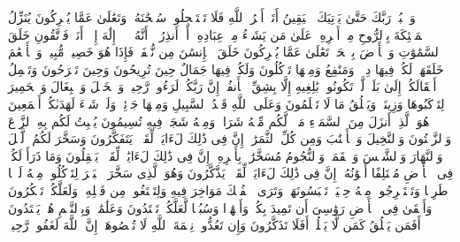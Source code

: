 \startbuffer[\q:15:99]
وَٱعۡبُدۡ رَبَّكَ حَتَّىٰ یَأۡتِیَكَ ٱلۡیَقِینُ%
\stopbuffer
\startbuffer[\q:16:1]
أَتَىٰۤ أَمۡرُ ٱللَّهِ فَلَا تَسۡتَعۡجِلُوهُۚ سُبۡحَٰنَهُۥ وَتَعَٰلَىٰ عَمَّا یُشۡرِكُونَ%
\stopbuffer
\startbuffer[\q:16:2]
یُنَزِّلُ ٱلۡمَلَٰۤئِكَةَ بِٱلرُّوحِ مِنۡ أَمۡرِهِۦ عَلَىٰ مَن یَشَاۤءُ مِنۡ عِبَادِهِۦۤ أَنۡ أَنذِرُوۤا۟ أَنَّهُۥ لَاۤ إِلَٰهَ إِلَّاۤ أَنَا۠ فَٱتَّقُونِ%
\stopbuffer
\startbuffer[\q:16:3]
خَلَقَ ٱلسَّمَٰوَٰتِ وَٱلۡأَرۡضَ بِٱلۡحَقِّۚ تَعَٰلَىٰ عَمَّا یُشۡرِكُونَ%
\stopbuffer
\startbuffer[\q:16:4]
خَلَقَ ٱلۡإِنسَٰنَ مِن نُّطۡفَةࣲ فَإِذَا هُوَ خَصِیمࣱ مُّبِینࣱ%
\stopbuffer
\startbuffer[\q:16:5]
وَٱلۡأَنۡعَٰمَ خَلَقَهَاۖ لَكُمۡ فِیهَا دِفۡءࣱ وَمَنَٰفِعُ وَمِنۡهَا تَأۡكُلُونَ%
\stopbuffer
\startbuffer[\q:16:6]
وَلَكُمۡ فِیهَا جَمَالٌ حِینَ تُرِیحُونَ وَحِینَ تَسۡرَحُونَ%
\stopbuffer
\startbuffer[\q:16:7]
وَتَحۡمِلُ أَثۡقَالَكُمۡ إِلَىٰ بَلَدࣲ لَّمۡ تَكُونُوا۟ بَٰلِغِیهِ إِلَّا بِشِقِّ ٱلۡأَنفُسِۚ إِنَّ رَبَّكُمۡ لَرَءُوفࣱ رَّحِیمࣱ%
\stopbuffer
\startbuffer[\q:16:8]
وَٱلۡخَیۡلَ وَٱلۡبِغَالَ وَٱلۡحَمِیرَ لِتَرۡكَبُوهَا وَزِینَةࣰۚ وَیَخۡلُقُ مَا لَا تَعۡلَمُونَ%
\stopbuffer
\startbuffer[\q:16:9]
وَعَلَى ٱللَّهِ قَصۡدُ ٱلسَّبِیلِ وَمِنۡهَا جَاۤئِرࣱۚ وَلَوۡ شَاۤءَ لَهَدَىٰكُمۡ أَجۡمَعِینَ%
\stopbuffer
\startbuffer[\q:16:10]
هُوَ ٱلَّذِیۤ أَنزَلَ مِنَ ٱلسَّمَاۤءِ مَاۤءࣰۖ لَّكُم مِّنۡهُ شَرَابࣱ وَمِنۡهُ شَجَرࣱ فِیهِ تُسِیمُونَ%
\stopbuffer
\startbuffer[\q:16:11]
یُنۢبِتُ لَكُم بِهِ ٱلزَّرۡعَ وَٱلزَّیۡتُونَ وَٱلنَّخِیلَ وَٱلۡأَعۡنَٰبَ وَمِن كُلِّ ٱلثَّمَرَٰتِۚ إِنَّ فِی ذَٰلِكَ لَءَایَةࣰ لِّقَوۡمࣲ یَتَفَكَّرُونَ%
\stopbuffer
\startbuffer[\q:16:12]
وَسَخَّرَ لَكُمُ ٱلَّیۡلَ وَٱلنَّهَارَ وَٱلشَّمۡسَ وَٱلۡقَمَرَۖ وَٱلنُّجُومُ مُسَخَّرَٰتُۢ بِأَمۡرِهِۦۤۚ إِنَّ فِی ذَٰلِكَ لَءَایَٰتࣲ لِّقَوۡمࣲ یَعۡقِلُونَ%
\stopbuffer
\startbuffer[\q:16:13]
وَمَا ذَرَأَ لَكُمۡ فِی ٱلۡأَرۡضِ مُخۡتَلِفًا أَلۡوَٰنُهُۥۤۚ إِنَّ فِی ذَٰلِكَ لَءَایَةࣰ لِّقَوۡمࣲ یَذَّكَّرُونَ%
\stopbuffer
\startbuffer[\q:16:14]
وَهُوَ ٱلَّذِی سَخَّرَ ٱلۡبَحۡرَ لِتَأۡكُلُوا۟ مِنۡهُ لَحۡمࣰا طَرِیࣰّا وَتَسۡتَخۡرِجُوا۟ مِنۡهُ حِلۡیَةࣰ تَلۡبَسُونَهَاۖ وَتَرَى ٱلۡفُلۡكَ مَوَاخِرَ فِیهِ وَلِتَبۡتَغُوا۟ مِن فَضۡلِهِۦ وَلَعَلَّكُمۡ تَشۡكُرُونَ%
\stopbuffer
\startbuffer[\q:16:15]
وَأَلۡقَىٰ فِی ٱلۡأَرۡضِ رَوَٰسِیَ أَن تَمِیدَ بِكُمۡ وَأَنۡهَٰرࣰا وَسُبُلࣰا لَّعَلَّكُمۡ تَهۡتَدُونَ%
\stopbuffer
\startbuffer[\q:16:16]
وَعَلَٰمَٰتࣲۚ وَبِٱلنَّجۡمِ هُمۡ یَهۡتَدُونَ%
\stopbuffer
\startbuffer[\q:16:17]
أَفَمَن یَخۡلُقُ كَمَن لَّا یَخۡلُقُۚ أَفَلَا تَذَكَّرُونَ%
\stopbuffer
\startbuffer[\q:16:18]
وَإِن تَعُدُّوا۟ نِعۡمَةَ ٱللَّهِ لَا تُحۡصُوهَاۤۗ إِنَّ ٱللَّهَ لَغَفُورࣱ رَّحِیمࣱ%
\stopbuffer
\startbuffer[\q:16:19]
